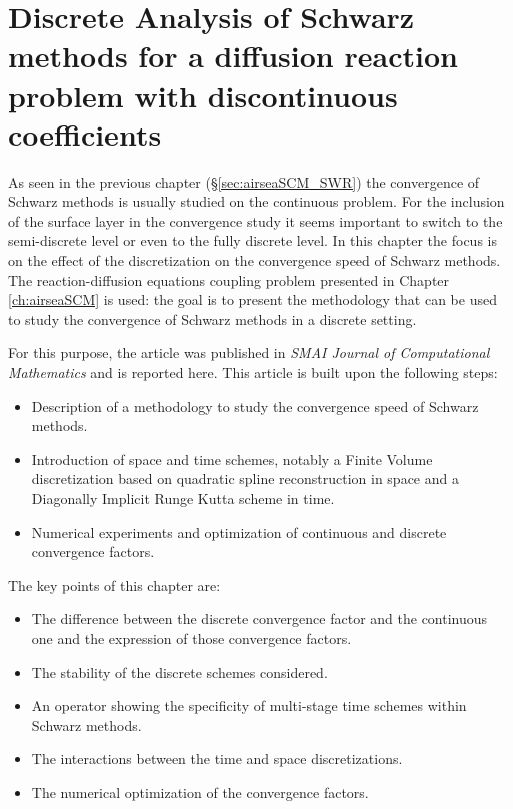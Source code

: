 \chapter{Discrete Analysis of Schwarz methods for a diffusion reaction problem with discontinuous coefficients}
\label{ch:discreteSchwarzAnalysis}
\minitoc
As seen in the previous chapter (\S \ref{sec:airseaSCM_SWR})
the convergence of Schwarz methods is usually studied on the
continuous problem. For the inclusion of the surface layer
in the convergence study
it seems important to switch to the semi-discrete level or even
to the fully discrete level.
In this chapter the focus is on the effect of the discretization
on the convergence speed of Schwarz methods. The reaction-diffusion
equations coupling problem presented in
Chapter \ref{ch:airseaSCM} is used: the goal is
to present the methodology that can be used to study the convergence
of Schwarz methods in a discrete setting.
\par
For this purpose, the article
\citep{clement_discrete_2022-1} was published in
\textit{SMAI Journal of Computational Mathematics} and is reported
here.
This article is built upon the following steps:
\begin{itemize}
	\item Description of a methodology to study the convergence
	speed of Schwarz methods.
	\item Introduction of space and time schemes,
		notably a Finite Volume discretization based
	on quadratic spline reconstruction in space and
		a Diagonally Implicit Runge Kutta scheme in time.
	\item Numerical experiments and optimization of continuous
		and discrete convergence factors.
\end{itemize}
The key points of this chapter are:
\begin{itemize}
	\item The difference between
	the discrete convergence factor and the continuous one
		and the expression of those convergence factors.
	\item The stability of the discrete schemes considered.
	\item An operator showing the specificity
	of multi-stage time schemes within Schwarz methods.
	\item The interactions between the time and space
		discretizations.
	\item The numerical optimization of the convergence factors.
\end{itemize}
